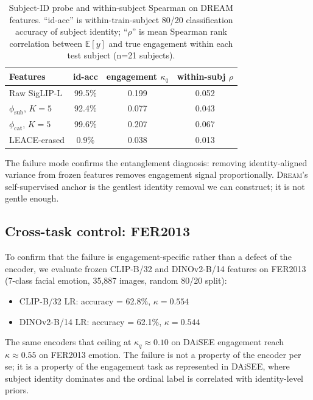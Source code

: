 \begin{table}[t]
\caption{Subject-ID probe and within-subject Spearman on DREAM
features. ``id-acc'' is within-train-subject 80/20 classification
accuracy of subject identity; ``$\rho$'' is mean Spearman rank
correlation between $\mathbb{E}[y]$ and true engagement within each
test subject (n=21 subjects).}
\label{tab:diag-dream}
\centering
\small
\begin{tabular}{lccc}
\toprule
Features & id-acc & engagement $\kappa_q$ & within-subj $\rho$\\
\midrule
Raw SigLIP-L & 99.5\% & 0.199 & 0.052\\
$\phi_{\mathrm{sub}}$, $K=5$ & 92.4\% & 0.077 & 0.043\\
$\phi_{\mathrm{cat}}$, $K=5$ & 99.6\% & 0.207 & 0.067\\
LEACE-erased & 0.9\% & 0.038 & 0.013\\
\bottomrule
\end{tabular}
\end{table}

The failure mode confirms the entanglement diagnosis: removing
identity-aligned variance from frozen features removes engagement
signal proportionally. \textsc{Dream}'s self-supervised anchor is
the gentlest identity removal we can construct; it is not
gentle enough.

\subsection{Cross-task control: FER2013}
\label{sec:fer2013}

To confirm that the failure is engagement-specific rather than a
defect of the encoder, we evaluate frozen CLIP-B/32 and DINOv2-B/14
features on FER2013~\cite{goodfellow2013fer2013} (7-class facial
emotion, 35,887 images, random 80/20 split):

\begin{itemize}\itemsep0pt
  \item CLIP-B/32 LR: accuracy = 62.8\%, $\kappa = 0.554$
  \item DINOv2-B/14 LR: accuracy = 62.1\%, $\kappa = 0.544$
\end{itemize}

The same encoders that ceiling at $\kappa_q \approx 0.10$ on DAiSEE
engagement reach $\kappa \approx 0.55$ on FER2013 emotion. The
failure is not a property of the encoder per se; it is a property
of the engagement task as represented in DAiSEE, where subject
identity dominates and the ordinal label is correlated with
identity-level priors.

